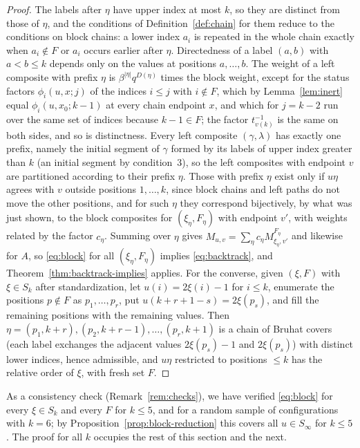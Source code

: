 \documentclass[11pt]{article}
\begin{document}
\begin{proof}
The labels after $\eta$ have upper index at most $k$, so they are
distinct from those of $\eta$, and the conditions of
Definition~\ref{def:chain} for them reduce to the conditions on block
chains: a lower index $a_i$ is repeated in the whole chain exactly when
$a_i\notin F$ or $a_i$ occurs earlier after $\eta$. Directedness of a
label $(a,b)$ with $a<b\leq k$ depends only on the values at positions
$a,\ldots,b$. The weight of a left composite with prefix $\eta$ is
$\beta^{|\eta|}q^{D(\eta)}$ times the block weight, except for the
status factors $\phi_i(u,x;j)$ of the indices $i\leq j$ with
$i\notin F$, which by Lemma~\ref{lem:inert} equal $\phi_i(u,x_0;k-1)$
at every chain endpoint $x$, and which for $j=k-2$ run over the same
set of indices because $k-1\in F$; the factor $t^{-1}_{v(k)}$ is the
same on both sides, and so is distinctness. Every left composite
$(\gamma,\lambda)$ has exactly one prefix, namely the initial segment
of $\gamma$ formed by its labels of upper index greater than $k$ (an
initial segment by condition~3), so the left composites with endpoint
$v$ are partitioned according to their prefix $\eta$. Those with
prefix $\eta$ exist only if $u\eta$ agrees with $v$ outside positions
$1,\ldots,k$, since block chains and left paths do not move the other
positions, and for such $\eta$ they correspond bijectively, by what
was just shown, to the block composites for $(\xi_\eta,F_\eta)$ with
endpoint $v'$, with weights related by the factor $c_\eta$. Summing
over $\eta$ gives
$M_{u,v}=\sum_\eta c_\eta M^{F_\eta}_{\xi_\eta,v'}$ and likewise for
$A$, so \eqref{eq:block} for all $(\xi_\eta,F_\eta)$ implies
\eqref{eq:backtrack}, and Theorem~\ref{thm:backtrack-implies} applies.
For the converse, given $(\xi,F)$ with $\xi\in S_k$ after
standardization, let $u(i)=2\xi(i)-1$ for $i\leq k$, enumerate the
positions $p\notin F$ as $p_1,\ldots,p_r$, put $u(k+r+1-s)=2\xi(p_s)$,
and fill the remaining positions with the remaining values. Then
$\eta=(p_1,k+r),(p_2,k+r-1),\ldots,(p_r,k+1)$ is a chain of Bruhat
covers (each label exchanges the adjacent values $2\xi(p_s)-1$ and
$2\xi(p_s)$) with distinct lower indices, hence admissible, and
$u\eta$ restricted to positions $\leq k$ has the relative order of
$\xi$, with fresh set $F$.
\end{proof}

As a consistency check (Remark~\ref{rem:checks}), we have verified
\eqref{eq:block} for every $\xi\in S_k$ and every $F$ for $k\leq5$,
and for a random sample of configurations with $k=6$; by
Proposition~\ref{prop:block-reduction} this covers all
$u\in S_\infty$ for $k\leq5$. The proof for all $k$ occupies the rest
of this section and the next.
\end{document}
